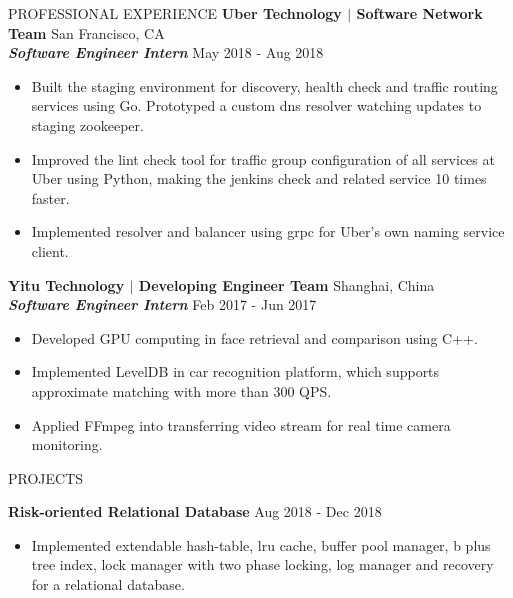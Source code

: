 \documentclass{res}
\begin{document}
\begin{resume}
\begin{section}{PROFESSIONAL EXPERIENCE}
\textbf{Uber Technology $\mid$ Software Network Team} \hfill {San Francisco, CA}\\
\textit{\textbf{Software Engineer Intern}} \hfill {May 2018 - Aug 2018}
\begin{itemize}[leftmargin=0.3in]
\item{Built the staging environment for discovery, health check and traffic routing services using Go. Prototyped a custom dns resolver watching updates to staging zookeeper.} 
\vspace{-0.4em}
\item{Improved the lint check tool for traffic group configuration of all services at Uber using Python, making the jenkins check and related service 10 times faster.}
\vspace{-0.4em}
\item{Implemented resolver and balancer using grpc for Uber’s own naming service client.}
\end{itemize}

\vspace{-0.6em}

\textbf{Yitu Technology $\mid$ Developing Engineer Team} \hfill {Shanghai, China} \\
\textbf{\textit{Software Engineer Intern}} \hfill {Feb 2017 - Jun 2017}
\begin{itemize}[leftmargin=0.3in]
\item{Developed GPU computing in face retrieval and comparison using C++.}
\vspace{-0.4em}
\item{Implemented LevelDB in car recognition platform, which supports approximate matching with more than 300 QPS.}
\vspace{-0.4em}
\item{Applied FFmpeg into transferring video stream for real time camera monitoring.}
\vspace{-0.4em}
\end{itemize}

\end{section}

\vspace{-0.5em}

\begin{section}{PROJECTS}
\vspace{1.5em}
\fullline
\vspace{-0.5em}

\textbf{Risk-oriented Relational Database} \hfill {Aug 2018 - Dec 2018} 
\begin{itemize}[leftmargin=0.3in]
\item{Implemented extendable hash-table, lru cache, buffer pool manager, b plus tree index, lock manager with two phase locking, log manager and recovery for a relational database.}
\end{itemize}


\end{section}
\end{resume}
\end{document}
